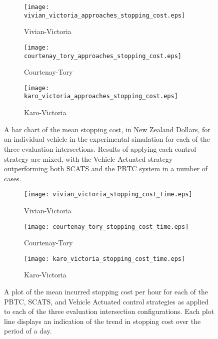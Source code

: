 \begin{figure}
\centering
\begin{subfigure}{.5\textwidth}
  \centering
  \texttt{[image: vivian\_victoria\_approaches\_stopping\_cost.eps]}
  \caption{Vivian-Victoria}
  \label{mean_stopping_cost:sub1}
\end{subfigure}%
\begin{subfigure}{.5\textwidth}
  \centering
  \texttt{[image: courtenay\_tory\_approaches\_stopping\_cost.eps]}
  \caption{Courtenay-Tory}
  \label{mean_stopping_cost:sub2}
\end{subfigure}

\vspace{1cm}

\begin{subfigure}{.5\textwidth}
  \centering
  \texttt{[image: karo\_victoria\_approaches\_stopping\_cost.eps]}
  \caption{Karo-Victoria}
  \label{mean_stopping_cost:sub3}
\end{subfigure}%
\caption{ A bar chart of the mean stopping cost, in New Zealand Dollars, for an individual vehicle in the experimental simulation for each of the three evaluation intersections. Results of applying each control strategy are mixed, with the Vehicle Actuated strategy outperforming both SCATS and the PBTC system in a number of cases.  }
\label{eval:mean_stopping_cost}
\end{figure}

\begin{figure}
\centering
\begin{subfigure}{.5\textwidth}
  \centering
  \texttt{[image: vivian\_victoria\_stopping\_cost\_time.eps]}
  \caption{Vivian-Victoria}
  \label{stopping_cost_time:sub1}
\end{subfigure}%
\begin{subfigure}{.5\textwidth}
  \centering
  \texttt{[image: courtenay\_tory\_stopping\_cost\_time.eps]}
  \caption{Courtenay-Tory}
  \label{stopping_cost_time:sub2}
\end{subfigure}

\vspace{1cm}

\begin{subfigure}{.5\textwidth}
  \centering
  \texttt{[image: karo\_victoria\_stopping\_cost\_time.eps]}
  \caption{Karo-Victoria}
  \label{stopping_cost_time:sub3}
\end{subfigure}%
\caption{ A plot of the mean incurred stopping cost per hour for each of the PBTC, SCATS, and Vehicle Actuated control strategies as applied to each of the three evaluation intersection configurations. Each plot line displays an indication of the trend in stopping cost over the period of a day.  }
\label{eval:stopping_cost_time }
\end{figure}

